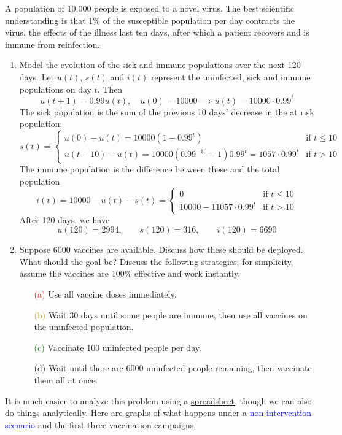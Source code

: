 \label{pg:virus}

A population of 10,000 people is exposed to a novel virus. The best scientific understanding is that 1\% of the susceptible population per day contracts the virus, the effects of the illness last ten days, after which a patient recovers and is immune from reinfection.
\begin{enumerate}
  \item Model the evolution of the sick and immune populations over the next 120 days.\smallbreak
  Let $u(t)$, $s(t)$ and $i(t)$ represent the uninfected, sick and immune populations on day $t$. Then
	\[
		u(t+1)= 0.99u(t),\quad u(0)=10000\implies u(t)=10000\cdot 0.99^t
	\]
	The sick population is the sum of the previous 10 days' decrease in the at risk population:
	\[
		s(t)=
		\begin{cases}
			u(0)-u(t)=10000(1-0.99^t)&\text{if }t\le 10\\
			u(t-10)-u(t)=10000(0.99^{-10}-1)0.99^t=1057\cdot 0.99^t&\text{if }t> 10
		\end{cases}
	\]
	The immune population is the difference between these and the total population
	\[
		i(t)=10000-u(t)-s(t)=
		\begin{cases}
			0&\text{if }t\le 10\\
			10000-11057\cdot 0.99^t&\text{if }t> 10
		\end{cases}
	\]
	After 120 days, we have
	\[
		u(120)=2994,\qquad s(120)=316,\qquad i(120)=6690
	\]
  
  \item Suppose 6000 vaccines are available. Discuss how these should be deployed. What should the goal be? Discuss the following strategies; for simplicity, assume the vaccines are 100\% effective and work instantly.
  \begin{enumerate}
    \item[\textcolor{red}{(a)}] Use all vaccine doses immediately.
  	\item[\textcolor{Goldenrod}{(b)}] Wait 30 days until some people are immune, then use all vaccines on the uninfected population.
  	\item[\textcolor{Green}{(c)}] Vaccinate 100 uninfected people per day.
  	\item[(d)] Wait until there are 6000 uninfected people remaining, then vaccinate them all at once.
	\end{enumerate}
\end{enumerate}
It is much easier to analyze this problem using a \href{http://math.uci.edu/~ndonalds/math8/virus.xlsx}{spreadsheet,} though we can also do things analytically. Here are graphs of what happens under a \textcolor{blue}{non-intervention scenario} and the first three vaccination campaigns.
